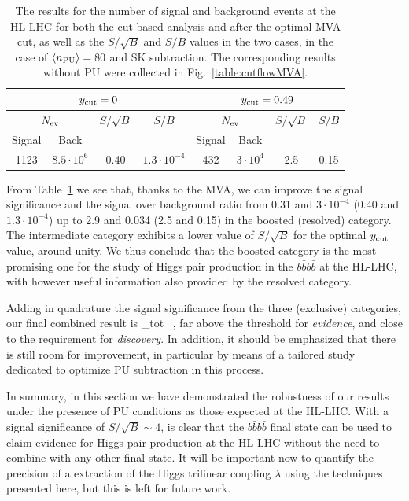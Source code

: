 \begin{table}[t]
\begin{tabular}{c|c|c|c||c|c|c|c}
    \multicolumn{4}{c||}{$y_{\rm cut}=0$} & \multicolumn{4}{c}{$y_{\rm cut}=0.49$}\\
    \hline
    \multicolumn{2}{c|}{$N_{\rm ev}$} &  $S/\sqrt{B}$  & $S/B$
    & \multicolumn{2}{c|}{$N_{\rm ev}$} &  $S/\sqrt{B}$  & $S/B$\\
        Signal & Back   &     &   &  Signal & Back   &     &    \\
    \hline
  1123  &    $8.5\cdot 10^6$   & 0.40       &  $1.3\cdot 10^{-4}$       &
  432  &  $3\cdot 10^4$        &   2.5      & 0.15 \\
        \hline
  \end{tabular}
  \caption{\small The results for the number of signal and
    background events
    at the HL-LHC for both the cut-based analysis and after the
    optimal MVA cut, as well as the $S/\sqrt{B}$ and $S/B$
    values in the two cases, in the case of $\left\langle n_{\rm PU}\right\rangle=80$
    and SK subtraction.
    The corresponding results without PU were collected
    in Fig.~\ref{table:cutflowMVA}.
        \label{table:cutflowMVA_PU}
  }
\end{table}

From Table~\ref{table:cutflowMVA_PU} we see that, thanks
to the MVA, we can improve the signal significance and the
signal over background ratio from 0.31 and $3\cdot 10^{-4}$
(0.40 and $1.3\cdot 10^{-4}$) up to 2.9 and 0.034 (2.5 and 0.15)
in the boosted (resolved) category.
%
The intermediate category exhibits a lower value of $S/\sqrt{B}$
for the optimal $y_{\rm cut}$ value, around unity.
%
We thus conclude that the boosted category is the most promising
one for the study of Higgs pair production in the $b\bar{b}b\bar{b}$
at the HL-LHC, with however useful information also provided
by the resolved category.

Adding in quadrature the signal significance from the three
(exclusive) categories, our final combined result is
\be
\lp {}\rp_{\rm tot}  \, ,
\ee
far above the threshold for {\it evidence}, and close to the
requirement for {\it discovery}.
%
In addition, it should be emphasized that there is still
room for improvement, in particular by means of a tailored
study dedicated to optimize PU subtraction in this process.



In summary, in this section we have demonstrated the robustness
of our results under the presence of PU conditions as those
expected at the HL-LHC.
%
With a signal significance of $S/\sqrt{B}\sim 4$, is clear that
the $b\bar{b}b\bar{b}$ final state can be used to claim evidence
for Higgs pair production at the HL-LHC without the need
to combine with any other final state.
%
It will be important now to quantify the precision of
a extraction of the Higgs trilinear coupling $\lambda$ using
the techniques presented here, but this is left for future work.
